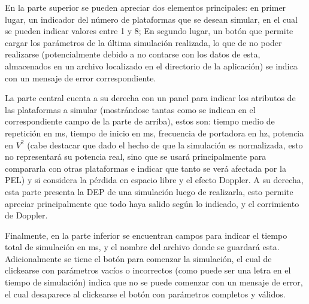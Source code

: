 \documentclass[a4paper,10pt]{article}
\begin{document}
En la parte superior se pueden apreciar dos elementos principales: en primer lugar, un indicador del número de plataformas que se desean simular, en el cual se pueden indicar valores entre 1 y 8; En segundo lugar, un botón que permite cargar los parámetros de la última simulación realizada, lo que de no poder realizarse (potencialmente debido a no contarse con los datos de esta, almacenados en un archivo localizado en el directorio de la aplicación) se indica con un mensaje de error correspondiente.
\par
La parte central cuenta a su derecha con un panel para indicar los atributos de las plataformas a simular (mostrándose tantas como se indican en el correspondiente campo de la parte de arriba), estos son: tiempo medio de repetición en ms, tiempo de inicio en ms, frecuencia de portadora en hz, potencia en $V^2$ (cabe destacar que dado el hecho de que la simulación es normalizada, esto no representará su potencia real, sino que se usará principalmente para compararla con otras plataformas e indicar que tanto se verá afectada por la PEL) y si considera la pérdida en espacio libre y el efecto Doppler. A su derecha, esta parte presenta la DEP de una simulación luego de realizarla, esto permite apreciar principalmente que todo haya salido según lo indicado, y el corrimiento de Doppler.
\par
Finalmente, en la parte inferior se encuentran campos para indicar el tiempo total de simulación en ms, y el nombre del archivo donde se guardará esta. Adicionalmente se tiene el botón para comenzar la simulación, el cual de clickearse con parámetros vacíos o incorrectos (como puede ser una letra en el tiempo de simulación) indica que no se puede comenzar con un mensaje de error, el cual desaparece al clickearse el botón con parámetros completos y válidos.
\end{document}
